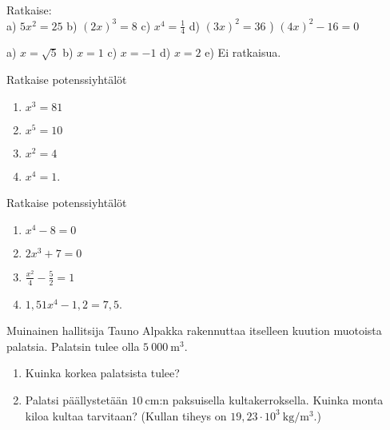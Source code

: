 \begin{tehtava}
Ratkaise: \\
a) $ 5x^2 = 25 $ \qquad
b) $ (2x)^3 = 8 $ \qquad
c) $ x^4 = \frac{1}{4} $ \qquad
d) $ (3x)^2 = 36 $ ) $ (4x)^2 - 16 = 0 $ 
\begin{vastaus}
a) $ x = \sqrt{5} $ \qquad
b) $ x = 1 $ \qquad
c) $ x = -1 $ \qquad
d) $ x = 2 $ \qquad
e) Ei ratkaisua. 
\end{vastaus}
\end{tehtava}

\begin{tehtava}
Ratkaise potenssiyhtälöt
\begin{enumerate}
\item $x^3 = 81$
\item $x^5 = 10$
\item $x^2 = 4$
\item $x^4 = 1$.
\end{enumerate}
\end{tehtava}

\begin{tehtava}
Ratkaise potenssiyhtälöt
\begin{enumerate}
\item $x^4 - 8 = 0$
\item $2x^3 + 7 = 0$
\item $\frac{x^2}{4} - \frac{5}{2} = 1$
\item $1,51 x^4 - 1,2 = 7,5$.
\end{enumerate}
\end{tehtava}

\begin{tehtava}
Muinainen hallitsija Tauno Alpakka rakennuttaa itselleen kuution muotoista palatsia.  Palatsin tulee olla $5\ 000\ \mathrm{m}^3$. 
\begin{enumerate}
\item Kuinka korkea palatsista tulee?
\item Palatsi päällystetään $10\ \mathrm{cm}$:n paksuisella kultakerroksella.  Kuinka monta kiloa kultaa tarvitaan? (Kullan tiheys on $19,23 \cdot 10^3\ \mathrm{ kg}/\mathrm{m}^3$.)
\end{enumerate}
\end{tehtava}

